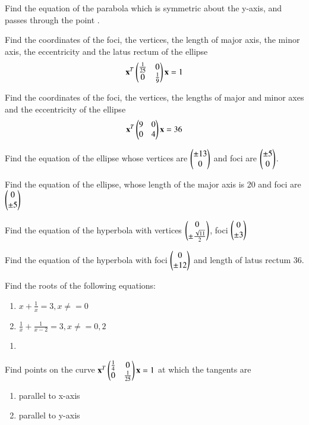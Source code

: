 \item Find the equation of the parabola which is symmetric about the y-axis, and passes through the point .
\item Find the coordinates of the foci, the vertices, the length of major axis, the minor axis, the eccentricity and the latus rectum of the ellipse 
%
\begin{align}
\mathbf{x}^T\begin{pmatrix}\frac{1}{25} & 0 \\ 0 & \frac{1}{9}\end{pmatrix}\mathbf{x} = 1
\end{align}
%
\item Find the coordinates of the foci, the vertices, the lengths of major and minor axes and the eccentricity of the ellipse 
%
\begin{align}
\mathbf{x}^T\begin{pmatrix}9 & 0 \\ 0 & 4\end{pmatrix}\mathbf{x} = 36
\end{align}
%
\solution

\item Find the equation of the ellipse whose vertices are $\begin{pmatrix}\pm 13\\ 0\end{pmatrix}$ and foci are $\begin{pmatrix}\pm 5\\ 0\end{pmatrix}$.
%
\item Find the equation of the ellipse, whose length of the major axis is 20 and foci are $\begin{pmatrix}0\\ \pm 5\end{pmatrix}$
%

\item Find the equation of the hyperbola with  vertices $\begin{pmatrix}0 \\ \pm \frac{\sqrt{11}}{2}\end{pmatrix}$, foci $\begin{pmatrix} 0\\ \pm 3\end{pmatrix}$
\item Find the equation of the hyperbola with   foci $\begin{pmatrix} 0\\ \pm 12\end{pmatrix}$ and length of latus rectum 36.
%

\item Find the roots of the following equations:
\begin{enumerate}
\item  $x + \frac{1}{x} = 3, x \ne =0 $
\item  $ \frac{1}{x} + \frac{1}{x-2}=3, x\ne =0, 2 $
\end{enumerate}
%
\solution
\begin{enumerate}
\item 
\end{enumerate}


\item Find points on the curve 
$
\mathbf{x}^T\begin{pmatrix}\frac{1}{4} & 0 \\ 0 & \frac{1}{25}\end{pmatrix}\mathbf{x} = 1
$
at which the tangents are 
\begin{enumerate}
\item parallel to x-axis
\item parallel to y-axis
\end{enumerate}
 
